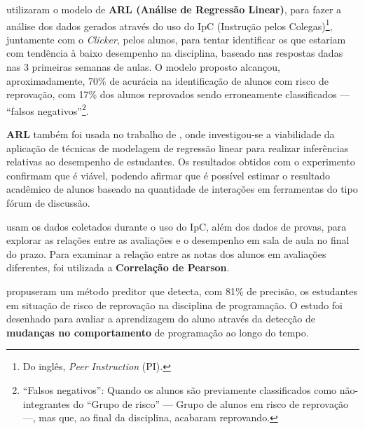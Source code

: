 



 utilizaram o modelo de \textbf{ARL (Análise de Regressão Linear)}, para fazer a análise dos dados gerados através do uso do IpC (Instrução pelos Colegas)\footnote[2]{Do inglês, \textit{Peer Instruction} (PI).}, juntamente com o \textit{Clicker}, pelos alunos, para tentar identificar os que estariam com tendência à baixo desempenho na disciplina, baseado nas respostas dadas nas 3 primeiras semanas de aulas. O modelo proposto alcançou, aproximadamente, 70\% de acurácia na identificação de alunos com risco de reprovação, com 17\% dos alunos reprovados sendo erroneamente classificados --- ``falsos negativos''\footnote[3]{``Falsos negativos'': Quando os alunos são previamente classificados como não-integrantes do ``Grupo de risco'' --- Grupo de alunos em risco de reprovação ---, mas que, ao final da disciplina, acabaram reprovando.}.

\textbf{ARL} também foi usada no trabalho de , onde investigou-se a viabilidade da aplicação de técnicas de modelagem de regressão linear para realizar inferências relativas ao desempenho de estudantes. Os resultados obtidos com o experimento confirmam que é viável, podendo afirmar que é possível estimar o resultado acadêmico de alunos baseado na quantidade de interações em ferramentas do tipo fórum de discussão. 

 usam os dados coletados durante o uso do IpC, além dos dados de provas, para explorar as relações entre as avaliações e o desempenho em sala de aula no final do prazo. Para examinar a relação entre as notas dos alunos em avaliações diferentes, foi utilizada a \textbf{Correlação de Pearson}.

 propuseram um método preditor que detecta, com 81\% de precisão, os estudantes em situação de risco de reprovação na disciplina de programação. O estudo foi desenhado para avaliar a aprendizagem do aluno através da detecção de \textbf{mudanças no comportamento} de programação ao longo do tempo.


